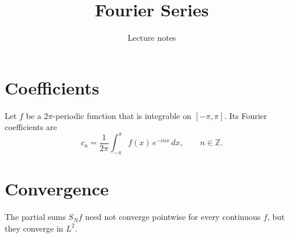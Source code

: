 \documentclass[11pt]{article}
\title{Fourier Series}
\author{Lecture notes}
\date{}
\begin{document}
\maketitle

\section{Coefficients}
Let $f$ be a $2\pi$-periodic function that is integrable on $[-\pi,\pi]$.
Its Fourier coefficients are
\[
c_n = \frac{1}{2\pi}\int_{-\pi}^{\pi} f(x)\, e^{-inx}\,dx, \qquad n \in \mathbb{Z}.
\]

\section{Convergence}
The partial sums $S_N f$ need not converge pointwise for every
continuous $f$, but they converge in $L^2$.
\end{document}
